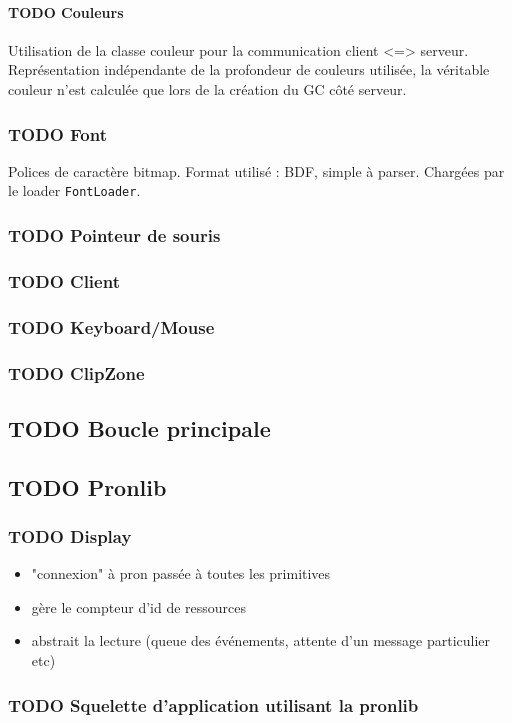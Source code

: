 \paragraph{TODO Couleurs}
Utilisation de la classe couleur pour la communication client <=> serveur. Représentation indépendante de la profondeur de couleurs utilisée, la véritable couleur n'est calculée que lors de la création du GC côté serveur.

\subsubsection{TODO Font}
Polices de caractère bitmap. Format utilisé : BDF, simple à parser. Chargées par le loader \verb|FontLoader|.

\subsubsection{TODO Pointeur de souris}

\subsubsection{TODO Client}

\subsubsection{TODO Keyboard/Mouse}

\subsubsection{TODO ClipZone}

\subsection{TODO Boucle principale}

\subsection{TODO Pronlib}

\subsubsection{TODO Display}

\begin{itemize}
  \item "connexion" à pron passée à toutes les primitives
  \item gère le compteur d'id de ressources
  \item abstrait la lecture (queue des événements, attente d'un message particulier etc)
\end{itemize}

\subsubsection{TODO Squelette d'application utilisant la pronlib}
